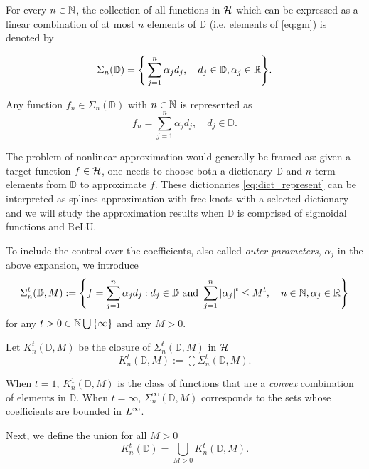 For every $n \in \mathbb{N}$, the collection of all functions in $\mathcal{H}$
which can be expressed as a linear combination of at most $n$ elements of
$\mathbb{D}$ (i.e. elements of \eqref{eq:gm}) is denoted by

\begin{equation}
    \label{eq:dict_represent}
    \Sigma_n(\mathbb{D}) = \Bigg\{
        \sum_{j=1}^n \alpha_j d_j, \quad
        d_j \in \mathbb{D}, \alpha_j \in \mathbb{R}
    \Bigg\}.
\end{equation}

Any function $f_n \in \Sigma_n(\mathbb{D})$ with $n \in \mathbb{N}$ is represented as
\begin{equation}
    \label{eq:gm}
    f_n = \sum_{j=1}^n \alpha_j d_j, \quad d_j \in \mathbb{D}.
\end{equation}

The problem of nonlinear approximation would generally be framed as: given a
target function $f \in \mathcal{H}$, one needs to choose both a dictionary
$\mathbb{D}$ and $n$-term elements from $\mathbb{D}$ to approximate $f$. These
dictionaries \eqref{eq:dict_represent} can be interpreted as splines
approximation with free knots with a selected dictionary and we will study the
approximation results when $\mathbb{D}$ is comprised of sigmoidal functions and
ReLU.

To include the control over the coefficients, also called \textit{outer
parameters}, $\alpha_j$ in the above expansion, we introduce
\begin{equation}
    \label{eq:dict_sigma}
    \Sigma^{t}_n(\mathbb{D}, M) := \Bigg\{
        f = \sum_{j=1}^n \alpha_j d_j: 
        d_j \in \mathbb{D} \textnormal{ and } 
        \sum_{j=1}^n \left| \alpha_j \right|^t \leq M^t, \quad 
        n \in \mathbb{N}, \alpha_j \in \mathbb{R}
    \Bigg\}
\end{equation}
for any $t > 0 \in \mathbb{N} \bigcup\, \{\infty\}$ and any $M > 0$. 

Let $K^t_n(\mathbb{D}, M)$ be the closure of $\Sigma^t_n(\mathbb{D}, M)$ in
$\mathcal{H}$
\begin{equation}
    K^t_n(\mathbb{D}, M) := \closure{\Sigma^t_n(\mathbb{D}, M)}.
\end{equation}

When $t = 1$, $K^1_n(\mathbb{D}, M)$ is the class of functions that are a
\textit{convex} combination of elements in $\mathbb{D}$. When $t = \infty$,
$\Sigma^{\infty}_n(\mathbb{D}, M)$ corresponds to the sets whose coefficients
are bounded in $L^{\infty}$. 

Next, we define the union for all $M > 0$
\begin{equation}
    K^t_n(\mathbb{D}) = \bigcup_{M > 0} K^t_n(\mathbb{D}, M).
\end{equation}

